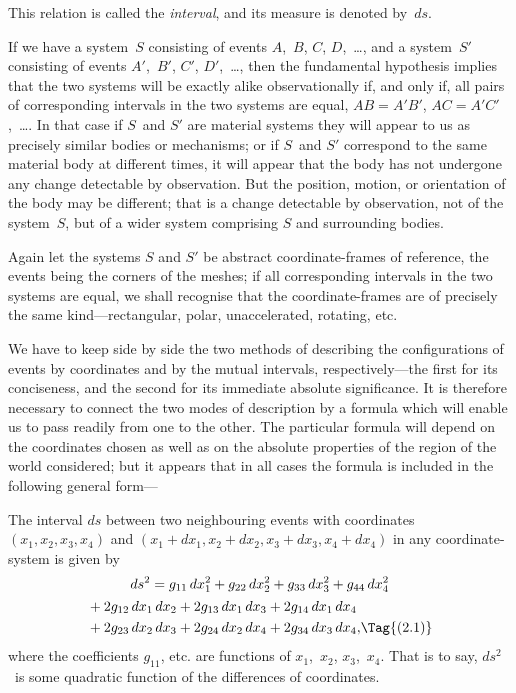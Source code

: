 \documentclass[12pt]{book}
\begin{document}
This relation is called the \emph{interval}, and its measure is denoted by~$ds$.%
%

If we have a system~$S$ consisting of events $A$,~$B$, $C$, $D$,~\dots, and a system~$S'$
consisting of events $A'$,~$B'$, $C'$, $D'$,~\dots, then the fundamental hypothesis implies
that the two systems will be exactly alike observationally if, and only if, all
pairs of corresponding intervals in the two systems are equal, $AB = A'B'$,
$AC = A'C'$,~\dots. In that case if $S$~and $S'$ are material systems they will appear
to us as precisely similar bodies or mechanisms; or if $S$~and $S'$ correspond to
the same material body at different times, it will appear that the body has
not undergone any change detectable by observation. But the position,
motion, or orientation of the body may be different; that is a change detectable
by observation, not of the system~$S$, but of a wider system comprising $S$
and surrounding bodies.

Again let the systems $S$ and $S'$ be abstract coordinate-frames of reference,
the events being the corners of the meshes; if all corresponding intervals in
the two systems are equal, we shall recognise that the coordinate-frames are
of precisely the same kind---rectangular, polar, unaccelerated, rotating, etc.


We have to keep side by side the two methods of describing the configurations
of events by coordinates and by the mutual intervals, respectively---the
first for its conciseness, and the second for its immediate absolute
significance. It is therefore necessary to connect the two modes of description
by a formula which will enable us to pass readily from one to the other. The
particular formula will depend on the coordinates chosen as well as on the
absolute properties of the region of the world considered; but it appears that
in all cases the formula is included in the following general form---

The interval $ds$ between two neighbouring events with coordinates
%
$(x_{1}, x_{2}, x_{3}, x_{4})$ and $(x_{1} + dx_{1}, x_{2} + dx_{2}, x_{3} + dx_{3}, x_{4} + dx_{4})$ in any coordinate-system
is given by
\begin{multline*}
  ds^{2} = g_{11}\, dx_{1}^{2} + g_{22}\, dx_{2}^{2} + g_{33}\, dx_{3}^{2} + g_{44}\, dx_{4}^{2} \\
  \begin{aligned}[b]
    &+ 2g_{12}\, dx_{1}\, dx_{2} + 2g_{13}\, dx_{1}\, dx_{3} + 2g_{14}\, dx_{1}\, dx_{4} \\
    &+ 2g_{23}\, dx_{2}\, dx_{3} + 2g_{24}\, dx_{2}\, dx_{4} + 2g_{34}\, dx_{3}\, dx_{4},
  \end{aligned}
\Tag{(2.1)}
\end{multline*}
where the coefficients $g_{11}$, etc. are functions of $x_{1}$,~$x_{2}$, $x_{3}$,~$x_{4}$. That is to say,
$ds^{2}$~is some quadratic function of the differences of coordinates.%
\end{document}
